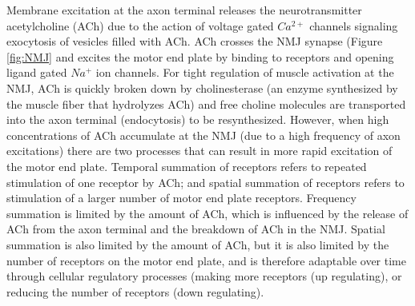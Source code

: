 Membrane excitation at the axon terminal releases the neurotransmitter acetylcholine (ACh) due to the action of voltage gated $Ca^{2+}$ channels signaling exocytosis of vesicles filled with ACh. ACh crosses the NMJ synapse (Figure \ref{fig:NMJ} and excites the motor end plate by binding to receptors and opening ligand gated $Na^+$ ion channels. For tight regulation of muscle activation at the NMJ, ACh is quickly broken down by cholinesterase (an enzyme synthesized by the muscle fiber that hydrolyzes ACh) and free choline molecules are transported into the axon terminal (endocytosis) to be resynthesized. However, when high concentrations of ACh accumulate at the NMJ (due to a high frequency of axon excitations) there are two processes that can result in more rapid excitation of the motor end plate.\footnotemark{} Temporal summation of receptors refers to repeated stimulation of one receptor by ACh; and spatial summation of receptors refers to stimulation of a larger number of motor end plate receptors. Frequency summation is limited by the amount of ACh, which is influenced by the release of ACh from the axon terminal and the breakdown of ACh in the NMJ. Spatial summation is also limited by the amount of ACh, but it is also limited by the number of receptors on the motor end plate, and is therefore adaptable over time through cellular regulatory processes (making more receptors (up regulating), or reducing the number of receptors (down regulating).


